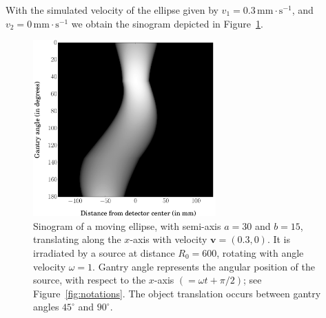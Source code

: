 \documentclass[twocolumn]{IEEEtran}
\newcommand{\bv}{\mathbf{v}}
\begin{document}
With the simulated velocity of the ellipse given by $v_1 = 0.3 \, \textrm{mm} \cdot \textrm{s}^{-1}$, and $v_2 = 0 \, \textrm{mm} \cdot \textrm{s}^{-1}$ we obtain the sinogram depicted in Figure~\ref{fig:sinogram}.
\begin{figure}[!ht]
	\centering
	\includegraphics[width=70mm]{figs/sinogram.png}
	\caption{Sinogram of a moving ellipse, with semi-axis $a = 30$ and $b = 15$, translating along the $x$-axis with velocity $\bv = (0.3,0)$. It is irradiated by a source at distance $R_0 = 600$, rotating with angle velocity $\omega = 1$. Gantry angle represents the angular position of the source, with respect to the $x$-axis $(= \omega t + \pi/2)$; see Figure~\ref{fig:notations}. The object translation occurs between gantry angles $45^{\circ}$ and $90^{\circ}$.\label{fig:sinogram}}
\end{figure}
\end{document}
